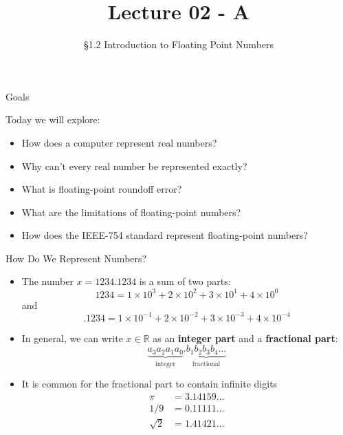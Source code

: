 \documentclass[10pt]{beamer}
\title{Lecture 02 - A}
\subtitle{\S 1.2 Introduction to Floating Point Numbers}
\begin{document}
\begin{frame}
  \titlepage
\end{frame}


\begin{frame}{Goals}

Today we will explore:\\[3mm]
\begin{itemize}
    \item How does a computer represent real numbers?
    \item Why can't every real number be represented exactly?
    \item What is floating-point roundoff error?
    \item What are the limitations of floating-point numbers?
    \item How does the IEEE-754 standard represent floating-point numbers?
\end{itemize}

\end{frame}




\begin{frame}{How Do We Represent Numbers?}
\begin{itemize}
    \item The number $x=1234.1234$ is a sum of two parts:
    \begin{equation*}
        1234 = 1\times 10^3+2 \times10^2+3\times 10^1+4\times10^0
    \end{equation*}
    and
    \begin{equation*}
        .1234 = 1\times 10^{-1} + 2\times 10^{-2} + 3\times 10^{-3} +4\times 10^{-4}
    \end{equation*}
    
    \item In general, we can write $x\in\mathbb{R}$ as an \textbf{integer part} and a \textbf{fractional part}:
        \begin{equation*}
        \underbrace{a_3a_2a_1a_0}_{\text{integer}}.\underbrace{b_1b_2b_3b_4\ldots}_{\text{fractional}}
        \end{equation*}
\item It is common for the fractional part to contain infinite digits
\begin{align*}  
\pi & = 3.14159\dots\\
1/9 & = 0.11111\dots\\
\sqrt{2} & = 1.41421\dots\\  
\end{align*}
\end{itemize}
\end{frame}
\end{document}
